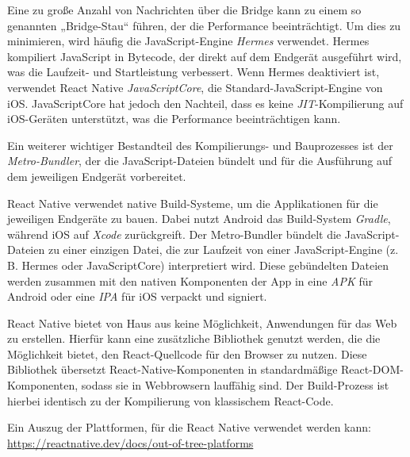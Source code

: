 \vspace{0.5cm}

Eine zu große Anzahl von Nachrichten über die Bridge kann zu einem so genannten „Bridge-Stau“ führen, der die Performance beeinträchtigt. Um dies zu minimieren, wird häufig die JavaScript-Engine \textit{Hermes} verwendet. Hermes kompiliert JavaScript in Bytecode, der direkt auf dem Endgerät ausgeführt wird, was die Laufzeit- und Startleistung verbessert. Wenn Hermes deaktiviert ist, verwendet React Native \textit{JavaScriptCore}, die Standard-JavaScript-Engine von iOS. JavaScriptCore hat jedoch den Nachteil, dass es keine \textit{JIT}-Kompilierung auf iOS-Geräten unterstützt, was die Performance beeinträchtigen kann.

\vspace{0.5cm}

Ein weiterer wichtiger Bestandteil des Kompilierungs- und Bauprozesses ist der \textit{Metro-Bundler}, der die JavaScript-Dateien bündelt und für die Ausführung auf dem jeweiligen Endgerät vorbereitet.

\vspace{0.5cm}

React Native verwendet native Build-Systeme, um die Applikationen für die jeweiligen Endgeräte zu bauen. Dabei nutzt Android das Build-System \textit{Gradle}, während iOS auf \textit{Xcode} zurückgreift. Der Metro-Bundler bündelt die JavaScript-Dateien zu einer einzigen Datei, die zur Laufzeit von einer JavaScript-Engine (z. B. Hermes oder JavaScriptCore) interpretiert wird. Diese gebündelten Dateien werden zusammen mit den nativen Komponenten der App in eine \textit{APK} für Android oder eine \textit{IPA} für iOS verpackt und signiert.

\vspace{0.5cm}

React Native bietet von Haus aus keine Möglichkeit, Anwendungen für das Web zu erstellen. Hierfür kann eine zusätzliche Bibliothek genutzt werden, die die Möglichkeit bietet, den React-Quellcode für den Browser zu nutzen. Diese Bibliothek übersetzt React-Native-Komponenten in standardmäßige React-DOM-Komponenten, sodass sie in Webbrowsern lauffähig sind. Der Build-Prozess ist hierbei identisch zu der Kompilierung von klassischem React-Code.

Ein Auszug der Plattformen, für die React Native verwendet werden kann:
\url{https://reactnative.dev/docs/out-of-tree-platforms}